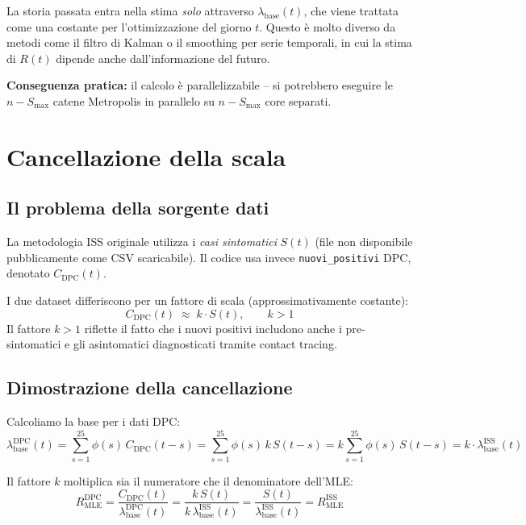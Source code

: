 \documentclass[12pt,a4paper]{article}
\newcommand{\lbase}{\lambda_{\mathrm{base}}}
\newcommand{\Smax}{S_{\max}}
\begin{document}
La storia passata entra nella stima \emph{solo} attraverso $\lbase(t)$, che viene
trattata come una costante per l'ottimizzazione del giorno $t$. Questo è molto diverso
da metodi come il filtro di Kalman o il smoothing per serie temporali, in cui la stima
di $R(t)$ dipende anche dall'informazione del futuro.

\textbf{Conseguenza pratica:} il calcolo è parallelizzabile -- si potrebbero eseguire
le $n - \Smax$ catene Metropolis in parallelo su $n - \Smax$ core separati.

\section{Cancellazione della scala}

\subsection{Il problema della sorgente dati}

La metodologia ISS originale utilizza i \emph{casi sintomatici} $S(t)$ (file non
disponibile pubblicamente come CSV scaricabile). Il codice usa invece
\texttt{nuovi\_positivi} DPC, denotato $C_{\mathrm{DPC}}(t)$.

I due dataset differiscono per un fattore di scala (approssimativamente costante):
\begin{equation}
  C_{\mathrm{DPC}}(t) \;\approx\; k \cdot S(t), \qquad k > 1
  \label{eq:scala}
\end{equation}
Il fattore $k > 1$ riflette il fatto che i nuovi positivi includono anche i
pre-sintomatici e gli asintomatici diagnosticati tramite contact tracing.

\subsection{Dimostrazione della cancellazione}

Calcoliamo la base per i dati DPC:
\begin{equation}
  \lbase^{\mathrm{DPC}}(t) = \sum_{s=1}^{25} \phi(s)\, C_{\mathrm{DPC}}(t-s)
  = \sum_{s=1}^{25} \phi(s)\, k\, S(t-s)
  = k \sum_{s=1}^{25} \phi(s)\, S(t-s)
  = k \cdot \lbase^{\mathrm{ISS}}(t)
\end{equation}

Il fattore $k$ moltiplica sia il numeratore che il denominatore dell'MLE:
\begin{equation}
  R_{\mathrm{MLE}}^{\mathrm{DPC}} = \frac{C_{\mathrm{DPC}}(t)}{\lbase^{\mathrm{DPC}}(t)}
  = \frac{k\,S(t)}{k\,\lbase^{\mathrm{ISS}}(t)}
  = \frac{S(t)}{\lbase^{\mathrm{ISS}}(t)}
  = R_{\mathrm{MLE}}^{\mathrm{ISS}}
  \label{eq:cancel}
\end{equation}
\end{document}
